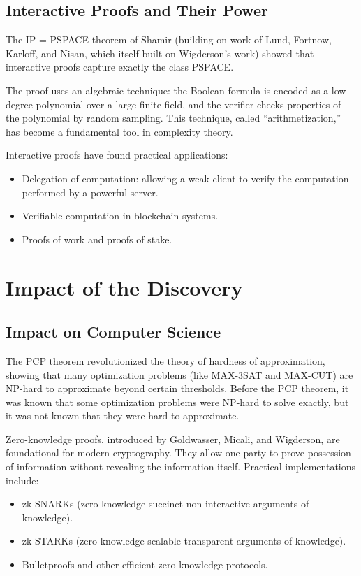 \subsection{Interactive Proofs and Their Power}

The IP = PSPACE theorem of Shamir (building on work of Lund, Fortnow, Karloff, and Nisan, which itself built on Wigderson's work) showed that interactive proofs capture exactly the class PSPACE.

The proof uses an algebraic technique: the Boolean formula is encoded as a low-degree polynomial over a large finite field, and the verifier checks properties of the polynomial by random sampling. This technique, called ``arithmetization,'' has become a fundamental tool in complexity theory.

Interactive proofs have found practical applications:
\begin{itemize}
\item Delegation of computation: allowing a weak client to verify the computation performed by a powerful server.
\item Verifiable computation in blockchain systems.
\item Proofs of work and proofs of stake.
\end{itemize}

\section{Impact of the Discovery}

\subsection{Impact on Computer Science}

The PCP theorem revolutionized the theory of hardness of approximation, showing that many optimization problems (like MAX-3SAT and MAX-CUT) are NP-hard to approximate beyond certain thresholds. Before the PCP theorem, it was known that some optimization problems were NP-hard to solve exactly, but it was not known that they were hard to approximate.

Zero-knowledge proofs, introduced by Goldwasser, Micali, and Wigderson, are foundational for modern cryptography. They allow one party to prove possession of information without revealing the information itself. Practical implementations include:
\begin{itemize}
\item zk-SNARKs (zero-knowledge succinct non-interactive arguments of knowledge).
\item zk-STARKs (zero-knowledge scalable transparent arguments of knowledge).
\item Bulletproofs and other efficient zero-knowledge protocols.
\end{itemize}

